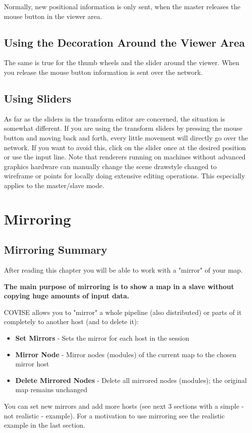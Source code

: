 Normally, new positional information is only sent, when the master
releases the mouse button in the viewer area. 

\subsection{Using the Decoration Around the Viewer Area}

The same is true for the thumb wheels and the slider around the
viewer. When you release the mouse button information is sent over
the network. 

\subsection{Using Sliders}

As far as the sliders in the transform editor are concerned, the situation
is somewhat different. If you are using the transform sliders by pressing
the mouse button and moving back and forth, every little movement will
directly go over the network. If you want to avoid this, click on the
slider once at the desired position or use the input line. Note that
renderers running on machines without advanced graphics hardware can
manually change the scene drawstyle changed to wireframe or points for
locally doing extensive editing operations. This especially applies to
the master/slave mode.


\section{Mirroring}
\label{Mirroring}

\subsection{Mirroring Summary}

After reading this chapter you will be able to work with a "mirror" of your map.

{\bf The main purpose of mirroring is to show a map in a slave without copying huge amounts
of input data.}
 
COVISE allows you to "mirror" a whole pipeline (also distributed) or parts of it completely to 
another host (and to delete it):
\begin{itemize}
\item {\bf Set Mirrors} - Sets the mirror for each host in the session
\item {\bf Mirror Node} - Mirror nodes (modules) of the current map to the chosen mirror host
\item {\bf Delete Mirrored Nodes} - Delete all mirrored nodes (modules); the original map remains unchanged
\end{itemize}
You can set new mirrors and add more hosts (see next 3 sections with a simple - not
realistic - example).
For a motivation to use mirroring see the realistic example in the last section.


